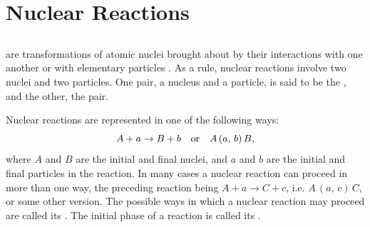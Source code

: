 \section{Nuclear Reactions}
\label{sec-42.9} 


\subsection{}\label{42.9.1}  are transformations of atomic nuclei brought about by their interactions with one another or with elementary particles . As a rule, nuclear reactions involve
two nuclei and two particles. One pair, a nucleus and a
particle, is said to be the , and the other, the  pair.

Nuclear reactions are represented in one of the following ways:
\begin{equation*}%
A + a \to B + b \qor A \,(a,\, b)\, B,
\end{equation*}
where $A$ and $B$ are the initial and final nuclei, and $a$ and $b$ are the initial and final particles in the reaction. In many cases a nuclear reaction can proceed in more than one way, the preceding reaction being $A + a \to C + c$, i.e. $A\, (a,\, c) \,C$, or some other version. The possible ways in which a nuclear reaction may proceed are called its . The initial phase of a reaction is called its .

